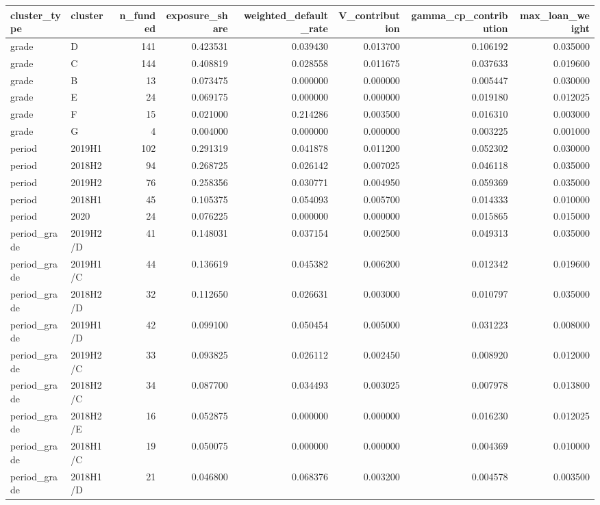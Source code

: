 \begin{tabular}{llrrrrrr}
\toprule
cluster\_type & cluster & n\_funded & exposure\_share & weighted\_default\_rate & V\_contribution & gamma\_cp\_contribution & max\_loan\_weight \\
\midrule
grade & D & 141 & 0.423531 & 0.039430 & 0.013700 & 0.106192 & 0.035000 \\
grade & C & 144 & 0.408819 & 0.028558 & 0.011675 & 0.037633 & 0.019600 \\
grade & B & 13 & 0.073475 & 0.000000 & 0.000000 & 0.005447 & 0.030000 \\
grade & E & 24 & 0.069175 & 0.000000 & 0.000000 & 0.019180 & 0.012025 \\
grade & F & 15 & 0.021000 & 0.214286 & 0.003500 & 0.016310 & 0.003000 \\
grade & G & 4 & 0.004000 & 0.000000 & 0.000000 & 0.003225 & 0.001000 \\
period & 2019H1 & 102 & 0.291319 & 0.041878 & 0.011200 & 0.052302 & 0.030000 \\
period & 2018H2 & 94 & 0.268725 & 0.026142 & 0.007025 & 0.046118 & 0.035000 \\
period & 2019H2 & 76 & 0.258356 & 0.030771 & 0.004950 & 0.059369 & 0.035000 \\
period & 2018H1 & 45 & 0.105375 & 0.054093 & 0.005700 & 0.014333 & 0.010000 \\
period & 2020 & 24 & 0.076225 & 0.000000 & 0.000000 & 0.015865 & 0.015000 \\
period\_grade & 2019H2/D & 41 & 0.148031 & 0.037154 & 0.002500 & 0.049313 & 0.035000 \\
period\_grade & 2019H1/C & 44 & 0.136619 & 0.045382 & 0.006200 & 0.012342 & 0.019600 \\
period\_grade & 2018H2/D & 32 & 0.112650 & 0.026631 & 0.003000 & 0.010797 & 0.035000 \\
period\_grade & 2019H1/D & 42 & 0.099100 & 0.050454 & 0.005000 & 0.031223 & 0.008000 \\
period\_grade & 2019H2/C & 33 & 0.093825 & 0.026112 & 0.002450 & 0.008920 & 0.012000 \\
period\_grade & 2018H2/C & 34 & 0.087700 & 0.034493 & 0.003025 & 0.007978 & 0.013800 \\
period\_grade & 2018H2/E & 16 & 0.052875 & 0.000000 & 0.000000 & 0.016230 & 0.012025 \\
period\_grade & 2018H1/C & 19 & 0.050075 & 0.000000 & 0.000000 & 0.004369 & 0.010000 \\
period\_grade & 2018H1/D & 21 & 0.046800 & 0.068376 & 0.003200 & 0.004578 & 0.003500 \\

\end{tabular}
